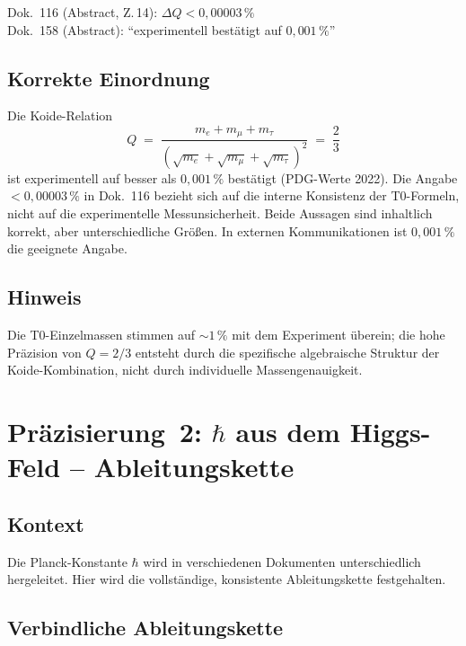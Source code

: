 Dok.~116 (Abstract, Z.\,14): $\Delta Q < 0{,}00003\,\%$ \\
Dok.~158 (Abstract): \enquote{experimentell bestätigt auf $0{,}001\,\%$}

\subsection*{Korrekte Einordnung}

Die Koide-Relation
\begin{equation}
  Q \;=\; \frac{m_e + m_\mu + m_\tau}
               {(\sqrt{m_e}+\sqrt{m_\mu}+\sqrt{m_\tau})^2}
  \;=\; \frac{2}{3}
  \tag{190.7}
\end{equation}
ist experimentell auf besser als $0{,}001\,\%$ bestätigt
(PDG-Werte 2022). Die Angabe $< 0{,}00003\,\%$ in Dok.~116 bezieht
sich auf die interne Konsistenz der T0-Formeln, nicht auf die
experimentelle Messunsicherheit. Beide Aussagen sind inhaltlich korrekt,
aber unterschiedliche Größen. In externen Kommunikationen ist
$0{,}001\,\%$ die geeignete Angabe.

\subsection*{Hinweis}

Die T0-Einzelmassen stimmen auf $\sim 1\,\%$ mit dem Experiment überein;
die hohe Präzision von $Q = 2/3$ entsteht durch die spezifische
algebraische Struktur der Koide-Kombination, nicht durch individuelle
Massengenauigkeit.

\section{\texorpdfstring{Präzisierung~2: $\hbar$ aus dem Higgs-Feld -- Ableitungskette}{Praezisierung 2: hbar aus dem Higgs-Feld -- Ableitungskette}}

\subsection*{Kontext}

Die Planck-Konstante $\hbar$ wird in verschiedenen Dokumenten
unterschiedlich hergeleitet. Hier wird die vollständige, konsistente
Ableitungskette festgehalten.

\subsection*{Verbindliche Ableitungskette}

